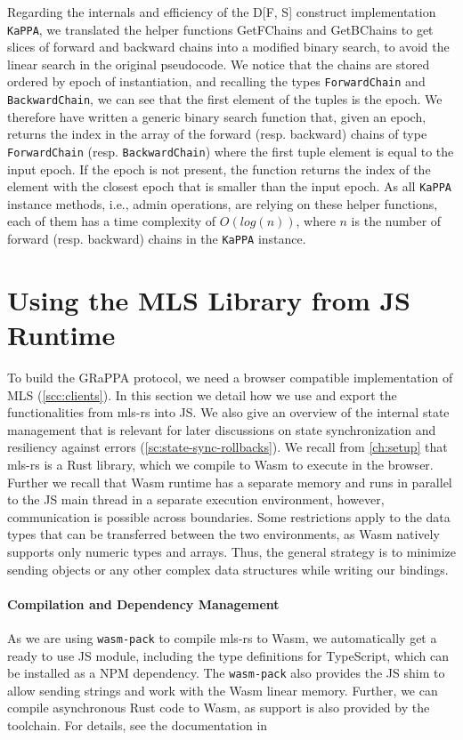 Regarding the internals and efficiency of the D[F, S] construct
implementation \texttt{KaPPA}, we translated the helper functions 
GetFChains and GetBChains to get
slices of forward and backward chains into a modified binary search,
to avoid the linear search in the original pseudocode.
We notice that the chains are stored ordered by epoch of instantiation,
and recalling the types \texttt{ForwardChain} and \texttt{BackwardChain},
we can see that the first element of the tuples is the epoch.
We therefore have written a generic binary search function that,
given an epoch, returns the index in the array of the forward (resp. backward)
chains of type \texttt{ForwardChain} (resp. \texttt{BackwardChain})
where the first tuple element is equal to the input epoch. If the epoch is not
present, the function returns the index of the element with the 
closest epoch that is smaller than the input epoch.
As all \texttt{KaPPA} instance methods, i.e., admin operations,
are relying on these helper functions, each of them has a time
complexity of $O(log(n))$, where $n$ is the number of forward (resp. backward)
chains in the \texttt{KaPPA} instance.

\section{Using the MLS Library from JS Runtime}\label{sc:js-bindings-for-mls}

To build the GRaPPA protocol, we need a browser compatible implementation
of MLS (\cref{scc:clients}).
In this section we detail how we use and export the functionalities from mls-rs
into JS. We also give an overview of the internal state management
that is relevant for later discussions on state synchronization and resiliency
against errors (\cref{sc:state-sync-rollbacks}).
We recall from \cref{ch:setup} that mls-rs is a Rust library, which we
compile to Wasm to execute in the browser.
Further we recall that Wasm runtime has a separate memory and runs in parallel
to the JS main thread in a separate execution environment, however, communication
is possible across boundaries. Some restrictions apply to the data types
that can be transferred between the two environments, as Wasm natively supports
only numeric types and arrays. Thus, the general strategy 
is to minimize sending objects or any other complex data structures 
while writing our bindings.

\paragraph{Compilation and Dependency Management}
As we are using \texttt{wasm-pack} to compile mls-rs to Wasm, we automatically
get a ready to use JS module, including the type definitions for TypeScript,
which can be installed as a NPM dependency. The \texttt{wasm-pack} also 
provides the JS shim to allow sending strings and work with the Wasm linear
memory. Further, we can compile asynchronous Rust code to Wasm, as support is also
provided by the toolchain. For details, see the documentation in~\cite{WasmBindgen}

